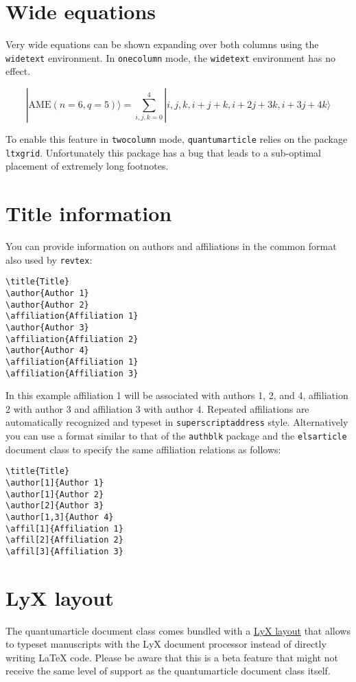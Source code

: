 \documentclass[a4paper,twocolumn,11pt,accepted=2017-05-09]{quantumarticle}
\begin{document}
\section{Wide equations}
Very wide equations can be shown expanding over both columns using the \texttt{widetext} environment.
In \texttt{onecolumn} mode, the \texttt{widetext} environment has no effect.
\begin{widetext}
  \begin{equation}
|\mathrm{AME}(n=6,q=5)\rangle=\sum_{i,j,k=0}^4 |i,j,k,i+j+k,i+2j+3k,i+3j+4k\rangle
  \end{equation}
\end{widetext}
To enable this feature in \texttt{twocolumn} mode, \texttt{quantumarticle} relies on the package \texttt{ltxgrid}.
Unfortunately this package has a bug that leads to a sub-optimal placement of extremely long footnotes.

\section{Title information}
\label{sec:title-information}
You can provide information on authors and affiliations in the common format also used by \texttt{revtex}:
\begin{verbatim}
\title{Title}
\author{Author 1}
\author{Author 2}
\affiliation{Affiliation 1}
\author{Author 3}
\affiliation{Affiliation 2}
\author{Author 4}
\affiliation{Affiliation 1}
\affiliation{Affiliation 3}
\end{verbatim}
In this example affiliation 1 will be associated with authors 1, 2, and 4, affiliation 2 with author 3 and affiliation 3 with author 4.
Repeated affiliations are automatically recognized and typeset in \texttt{superscriptaddress} style.
Alternatively you can use a format similar to that of the \texttt{authblk} package and the \texttt{elsarticle} document class to specify the same affiliation relations as follows:
\begin{verbatim}
\title{Title}
\author[1]{Author 1}
\author[1]{Author 2}
\author[2]{Author 3}
\author[1,3]{Author 4}
\affil[1]{Affiliation 1}
\affil[2]{Affiliation 2}
\affil[3]{Affiliation 3}
\end{verbatim}

\section{LyX layout}
\label{sec:lyx-layout}

The quantumarticle document class comes bundled with a \href{https://raw.githubusercontent.com/quantum-journal/quantum-journal/master/quantum-lyx-template.lyx}{LyX layout} that allows to typeset manuscripts with the LyX document processor instead of directly writing LaTeX code. Please be aware that this is a beta feature that might not receive the same level of support as the quantumarticle document class itself.
\end{document}
